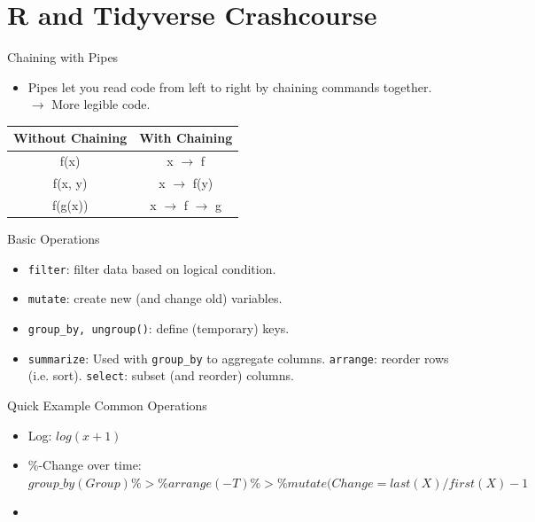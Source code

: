 \documentclass[12pt,aspectratio=169]{beamer}
\begin{document}
\section{R and Tidyverse Crashcourse}
\begin{frame}{Chaining with Pipes}
\begin{itemize}
    \item Pipes let you read code from left to right by chaining commands together. $\rightarrow$ More legible code. 
\end{itemize}

\begin{table}[]
    \centering
    \begin{tabular}{|c|c|}
    \hline
    Without Chaining & With Chaining \\
    \hline
    f(x)  &  x $\rightarrow$ f \\
    f(x, y) & x $\rightarrow$ f(y) \\
    f(g(x)) & x $\rightarrow$ f $\rightarrow$ g \\
    \hline
    \end{tabular}
\end{table}
\end{frame}

\begin{frame}{Basic Operations}
    \begin{itemize}
        \item \texttt{filter}: filter data based on logical condition.
        \item \texttt{mutate}: create new (and change old) variables.
        \item \texttt{group\_by, ungroup()}: define (temporary) keys.
        \item \texttt{summarize}: Used with \texttt{group\_by} to aggregate columns.
        \texttt{arrange}: reorder rows (i.e. sort).
        \texttt{select}: subset (and reorder) columns.
    \end{itemize}
\end{frame}

\begin{frame}{Quick Example}
Common Operations
    \begin{itemize}
        \item Log: $log(x+1)$
        \item \%-Change over time: $group\_by(Group) \%>\% arrange(-T) \%>\% mutate(Change = last(X)/first(X) - 1$
        \item 
    \end{itemize}
\end{frame}
\end{document}
